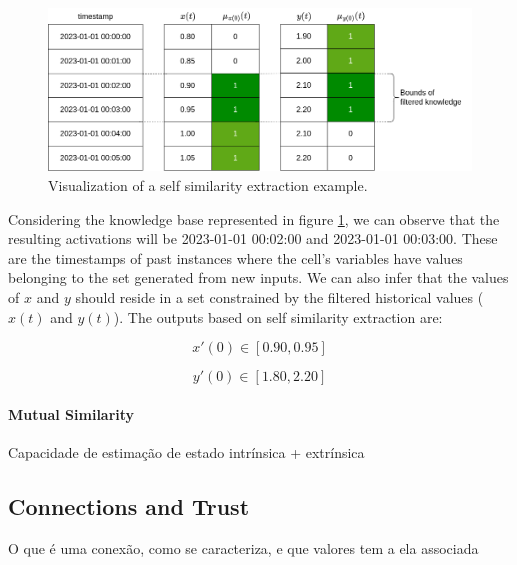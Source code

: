 \begin{figure}[h!]
    \centering
    \includegraphics[width=\linewidth]{figures/chapter4/cell/solo_state_estimation.drawio.png}
    \caption{Visualization of a self similarity extraction example.}
    \label{fig:solo_state_estimation}
\end{figure}

Considering the knowledge base represented in figure \ref{fig:solo_state_estimation}, we can observe that the resulting activations will be 2023-01-01 00:02:00 and 2023-01-01 00:03:00. These are the timestamps of past instances where the cell's variables have values belonging to the set generated from new inputs. We can also infer that the values of $x$ and $y$ should reside in a set constrained by the filtered historical values ($x(t)$ and $y(t)$). The outputs based on self similarity extraction are:

\begin{equation}
    x'(0) \in [0.90, 0.95]
\end{equation}

\begin{equation}
    y'(0) \in [1.80, 2.20]
\end{equation}

\paragraph{Mutual Similarity}
Capacidade de estimação de estado intrínsica + extrínsica

\subsection{Connections and Trust}
O que é uma conexão, como se caracteriza, e que valores tem a ela associada
